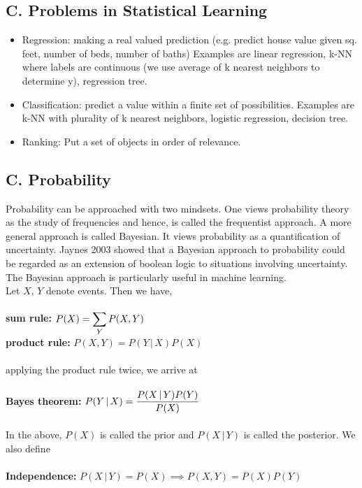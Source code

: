 \documentclass[10pt]{article}
\begin{document}
		\subsection*{C. Problems in Statistical Learning}
			\begin{itemize}
				\item Regression: making a real valued prediction (e.g. predict house value given sq. feet, 
					number of beds, number of baths) Examples are linear regression, k-NN where labels 
					are continuous (we use average of k nearest neighbors to determine y), regression tree. 
				\item Classification: predict a value within a finite set of possibilities. Examples are k-NN with 
					plurality of k nearest neighbors, logistic regression, decision tree. 
				\item Ranking: Put a set of objects in order of relevance. 
			\end{itemize}
		\subsection*{C. Probability}
			Probability can be approached with two mindsets. One views probability theory as the study of 
			frequencies and hence, is called the frequentist approach. A more general approach is called 
			Bayesian. It views probability as a quantification of uncertainty. Jaynes 2003 showed that 
			a Bayesian approach to probability could be regarded as an extension of boolean logic to
			situations involving uncertainty. The Bayesian approach is particularly useful in machine 
			learning. \\
			
			\noindent Let $X, \, Y$ denote events. Then we have, \\ \\
			\indent \indent \textbf{ sum rule:} \indent $\mathlarger{ P(X) = \sum_Y P(X,Y) }$ \\
			\indent \textbf{product rule: } $ P(X,Y) = P(Y \, | \, X)P(X) $ \\ \\
			\noindent applying the product rule twice, we arrive at \\ \\
			\indent \textbf{Bayes theorem:} $\mathlarger {P(Y \, | \, X) = \frac{P(X \, | \, Y)P(Y)}{P(X)}}$ \\ \\
			\noindent In the above, $P(X)$ is called the prior and $P(X \, | \, Y)$ is called the posterior. 
			\noindent We also define \\ \\
			 \textbf{Independence: } $P(X \, | \, Y) = P(X) \implies P(X,Y) = P(X)P(Y)$ \\
			
\end{document}
